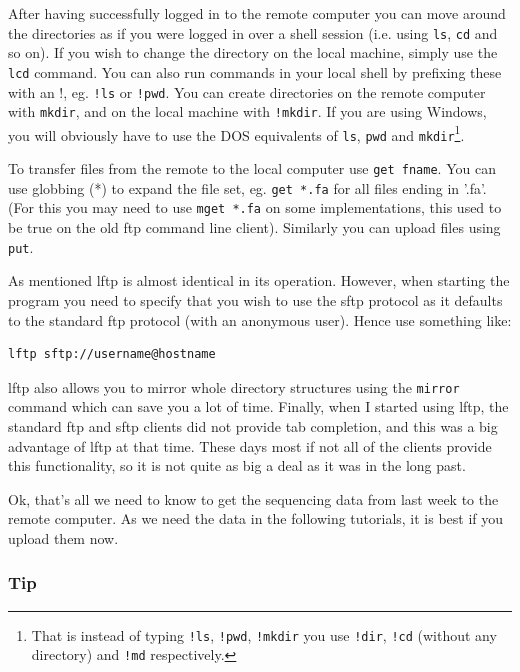 \documentclass[11pt]{article}
\begin{document}
After having successfully logged in to the remote computer you can move
around the directories as if you were logged in over a shell session
(i.e. using \texttt{ls}, \texttt{cd} and so on). If you wish to change the directory
on the local machine, simply use the \texttt{lcd} command. You can also run
commands in your local shell by prefixing these with an !, eg. \texttt{!ls} or
\texttt{!pwd}. You can create directories on the remote computer with \texttt{mkdir},
and on the local machine with \texttt{!mkdir}. If you are using Windows, you will
obviously have to use the DOS equivalents of \texttt{ls}, \texttt{pwd} and \texttt{mkdir}\footnote{That is instead of typing \texttt{!ls}, \texttt{!pwd}, \texttt{!mkdir} you use \texttt{!dir}, \texttt{!cd} (without any directory)
and \texttt{!md} respectively.}.

To transfer files from the
remote to the local computer use \texttt{get fname}. You can use globbing (*)
to expand the file set, eg. \texttt{get *.fa} for all files ending in '.fa'.
(For this you may need to use \texttt{mget *.fa} on some implementations, this
used to be true on the old ftp command line client). Similarly you can
upload files using \texttt{put}.

As mentioned lftp is almost identical in its operation. However, when
starting the program you need to specify that you wish to use the sftp
protocol as it defaults to the standard ftp protocol (with an anonymous
user). Hence use something like:

\begin{verbatim}
lftp sftp://username@hostname
\end{verbatim}

lftp also allows you to mirror whole directory structures using the
\texttt{mirror} command which can save you a lot of time. Finally, when I
started using lftp, the standard ftp and sftp clients did not provide
tab completion, and this was a big advantage of lftp at that time. These
days most if not all of the clients provide this functionality, so it is
not quite as big a deal as it was in the long past.

Ok, that's all we need to know to get the sequencing data from last
week to the remote computer. As we need the data in the following
tutorials, it is best if you upload them now.

\subsubsection{Tip}
\label{sec:orgheadline13}
\end{document}
